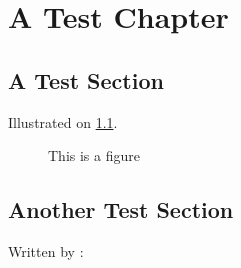 \newcommand{\thetitle}{The Great Project\\ And How to Typeset it}
\newcommand{\thegroup}{Group XXXX}
\newcommand{\theauthors}{
	Anders Andersen\\
	Anders Andersen\\
	Anders Andersen\\
	Anders Andersen
}
\newcommand{\thesupervisor}{Your Supervisor}
\newcommand{\thestudy}{Your Study}
\newcommand{\thetheme}{Your Theme}
\newcommand{\theprojectperiod}{Spring / Summer}
\newcommand{\deadline}{\today}





\chapter{A Test Chapter}
\lipsum[1]

\section{A Test Section}
\lipsum[2] \autocite{goossens93}

\lipsum[3] Illustrated on \cref{fig:themissingfigure}.
\begin{figure}[h]
	\centering
	\caption{This is a figure}
	\label{fig:themissingfigure}
\end{figure}

\section{Another Test Section}
\lipsum[4]

Written by \textcite{greenwade93}:
\lipsum[5] 

\printbibliography[
	heading=bibintoc         %
	,title={Litteraturliste}%
]

\listoffigures

